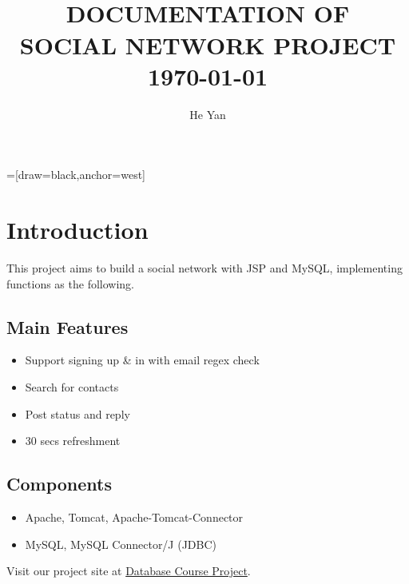 


=[draw=black,anchor=west]
\title{
        \HRule{2pt}\\
        \LARGE \textbf{\uppercase{Documentation of\\ Social Network Project}}
        \HRule{2pt} \\ [0.5cm]
        \normalsize \today \vspace*{5\baselineskip}}

\date{}

\author{He Yan}

\maketitle
\tableofcontents
\setcounter{page}{0}
\thispagestyle{empty}
\newpage

\section{Introduction}

This project aims to build a social network with JSP and MySQL, implementing functions as the following.

\subsection{Main Features}
\begin{itemize}
	\item Support signing up \& in with email regex check
	\item Search for contacts
	\item Post status and reply
	\item 30 secs refreshment
\end{itemize}

\subsection{Components}
\begin{itemize}
	\item Apache, Tomcat, Apache-Tomcat-Connector
	\item MySQL, MySQL Connector/J (JDBC)
\end{itemize}

Visit our project site at \href{http://54.250.244.23/database-project/db/main.jsp}{Database Course Project}.

